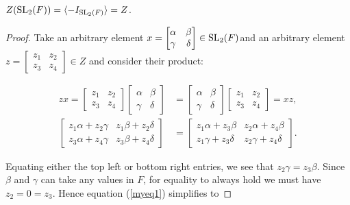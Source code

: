 \begin{lemma}
\label{SpecialSubgroups.center_SL2_eq_Z}
\leanok
$Z(\operatorname{SL}_2(F)) = \langle - I_{\operatorname{SL}_2(F)}\rangle = Z$.
\end{lemma}
\begin{proof} 
\leanok
    Take an arbitrary element $x=\begin{bmatrix} \alpha & \beta \\ \gamma & \delta \end{bmatrix} \in \operatorname{SL}_2(F)$and  an arbitrary element $z = \begin{bmatrix} z_1 & z_2 \\ z_3 & z_4 \end{bmatrix} \in Z$ and consider their product:

\begin{align}\label{myeq1} zx = \begin{bmatrix} z_1 & z_2 \\ z_3 & z_4 \end{bmatrix} \begin{bmatrix} \alpha & \beta \\ \gamma & \delta \end{bmatrix} &= \begin{bmatrix} \alpha & \beta \\ \gamma & \delta \end{bmatrix} \begin{bmatrix} z_1 & z_2 \\ z_3 & z_4 \end{bmatrix} = xz, \nonumber \\[1.5ex]
\begin{bmatrix} z_1 \alpha + z_2 \gamma & z_1 \beta + z_2 \delta \\ z_3 \alpha + z_4 \gamma & z_3 \beta + z_4 \delta \end{bmatrix} &= \begin{bmatrix} z_1 \alpha + z_3 \beta & z_2 \alpha + z_4 \beta \\ z_1 \gamma + z_3 \delta & z_2 \gamma + z_4 \delta \end{bmatrix}.
\end{align}

\noindent Equating either the top left or bottom right entries, we see that $z_2 \gamma = z_3 \beta$. Since $\beta$ and $\gamma$ can take any values in $F$, for equality to always hold we must have $z_2 = 0 = z_3$. Hence equation (\ref{myeq1}) simplifies to


\end{proof}
